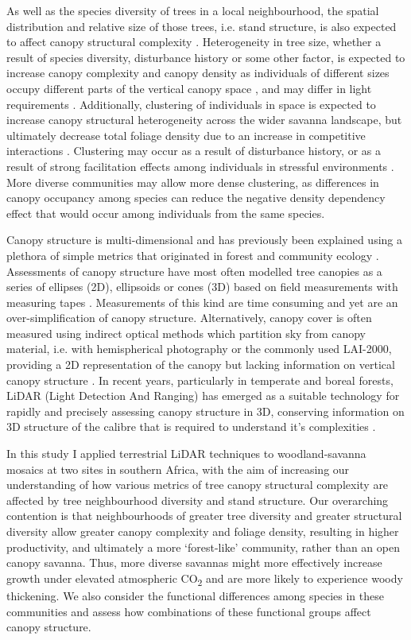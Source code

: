 \documentclass[11pt,a4paper]{article}
\begin{document}
As well as the species diversity of trees in a local neighbourhood, the spatial distribution and relative size of those trees, i.e. stand structure, is also expected to affect canopy structural complexity \citep{Stark2015}. Heterogeneity in tree size, whether a result of species diversity, disturbance history or some other factor, is expected to increase canopy complexity and canopy density as individuals of different sizes occupy different parts of the vertical canopy space \citep{Panzou2020}, and may differ in light requirements \citep{CharlesDominique2018}. Additionally, clustering of individuals in space is expected to increase canopy structural heterogeneity across the wider savanna landscape, but ultimately decrease total foliage density due to an increase in competitive interactions \citep{Dohn2017}. Clustering may occur as a result of disturbance history, or as a result of strong facilitation effects among individuals in stressful environments \citep{Ratcliffe2017}. More diverse communities may allow more dense clustering, as differences in canopy occupancy among species can reduce the negative density dependency effect that would occur among individuals from the same species.

Canopy structure is multi-dimensional and has previously been explained using a plethora of simple metrics that originated in forest and community ecology \citep{Kershaw2017}. Assessments of canopy structure have most often modelled tree canopies as a series of ellipses (2D), ellipsoids or cones (3D) based on field measurements with measuring tapes \citep{Jucker2015}. Measurements of this kind are time consuming and yet are an over-simplification of canopy structure. Alternatively, canopy cover is often measured using indirect optical methods which partition sky from canopy material, i.e. with hemispherical photography or the commonly used LAI-2000, providing a 2D representation of the canopy but lacking information on vertical canopy structure \citep{Jonckheere2004}. In recent years, particularly in temperate and boreal forests, LiDAR (Light Detection And Ranging) has emerged as a suitable technology for rapidly and precisely assessing canopy structure in 3D, conserving information on 3D structure of the calibre that is required to understand it's complexities \citep{Muir2018, Calders2020}.

In this study I applied terrestrial LiDAR techniques to woodland-savanna mosaics at two sites in southern Africa, with the aim of increasing our understanding of how various metrics of tree canopy structural complexity are affected by tree neighbourhood diversity and stand structure. Our overarching contention is that neighbourhoods of greater tree diversity and greater structural diversity allow greater canopy complexity and foliage density, resulting in higher productivity, and ultimately a more `forest-like' community, rather than an open canopy savanna. Thus, more diverse savannas might more effectively increase growth under elevated atmospheric CO\textsubscript{2} and are more likely to experience woody thickening. We also consider the functional differences among species in these communities and assess how combinations of these functional groups affect canopy structure.
\end{document}
